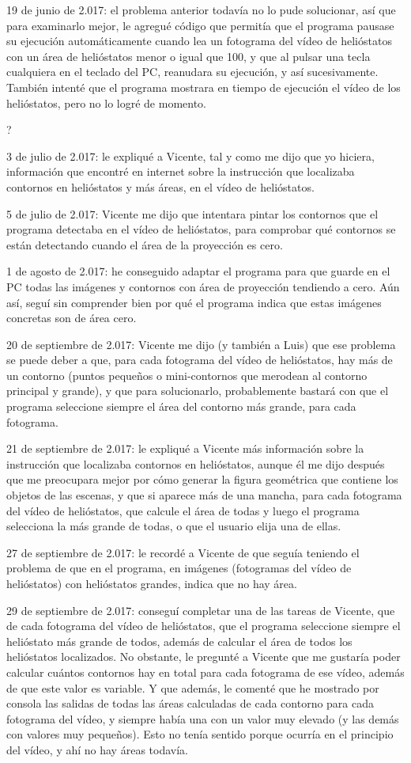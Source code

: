 \documentclass[12pt]{article}
\begin{document}
19 de junio de 2.017: el problema anterior todavía no lo pude solucionar, así que para examinarlo mejor, le agregué código que permitía que el programa pausase su ejecución automáticamente cuando lea un fotograma del vídeo de helióstatos con un área de helióstatos menor o igual que 100, y que al pulsar una tecla cualquiera en el teclado del PC, reanudara su ejecución, y así sucesivamente. También intenté que el programa mostrara en tiempo de ejecución el vídeo de los helióstatos, pero no lo logré de momento.

?

3 de julio de 2.017: le expliqué a Vicente, tal y como me dijo que yo hiciera, información que encontré en internet sobre la instrucción que localizaba contornos en helióstatos y más áreas, en el vídeo de helióstatos.

5 de julio de 2.017: Vicente me dijo que intentara pintar los contornos que el programa detectaba en el vídeo de helióstatos, para comprobar qué contornos se están detectando cuando el área de la proyección es cero.

1 de agosto de 2.017: he conseguido adaptar el programa para que guarde en el PC todas las imágenes y contornos con área de proyección tendiendo a cero. Aún así, seguí sin comprender bien por qué el programa indica que estas imágenes concretas son de área cero.

20 de septiembre de 2.017: Vicente me dijo (y también a Luis) que ese problema se puede deber a que, para cada fotograma del vídeo de helióstatos, hay más de un contorno (puntos pequeños o mini-contornos que merodean al contorno principal y grande), y que para solucionarlo, probablemente bastará con que el programa seleccione siempre el área del contorno más grande, para cada fotograma.

21 de septiembre de 2.017: le expliqué a Vicente más información sobre la instrucción que localizaba contornos en helióstatos, aunque él me dijo después que me preocupara mejor por cómo generar la figura geométrica que contiene los objetos de las escenas, y que si aparece más de una mancha, para cada fotograma del vídeo de helióstatos, que calcule el área de todas y luego el programa selecciona la más grande de todas, o que el usuario elija una de ellas.

27 de septiembre de 2.017: le recordé a Vicente de que seguía teniendo el problema de que en el programa, en imágenes (fotogramas del vídeo de helióstatos) con helióstatos grandes, indica que no hay área.

29 de septiembre de 2.017: conseguí completar una de las tareas de Vicente, que de cada fotograma del vídeo de helióstatos, que el programa seleccione siempre el helióstato más grande de todos, además de calcular el área de todos los helióstatos localizados. No obstante, le pregunté a Vicente que me gustaría poder calcular cuántos contornos hay en total para cada fotograma de ese vídeo, además de que este valor es variable. Y que además, le comenté que he mostrado por consola las salidas de todas las áreas calculadas de cada contorno para cada fotograma del vídeo, y siempre había una con un valor muy elevado (y las demás con valores muy pequeños). Esto no tenía sentido porque ocurría en el principio del vídeo, y ahí no hay áreas todavía.
\end{document}
